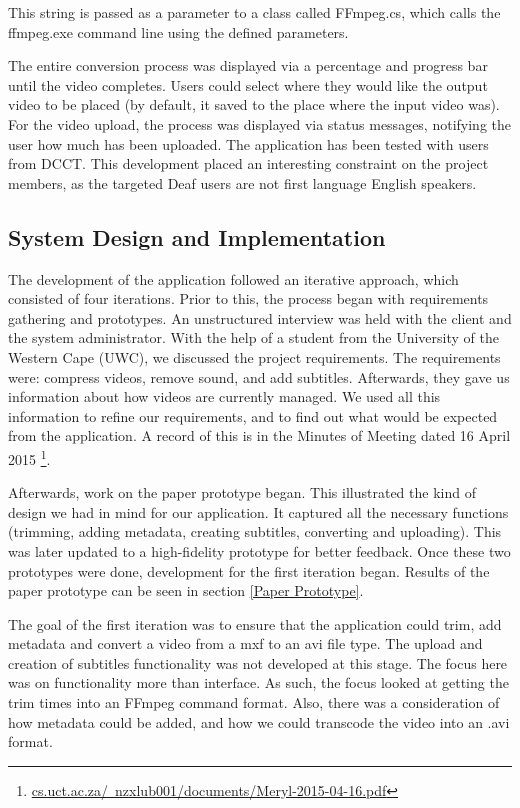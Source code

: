 \documentclass{sig-alternate-05-2015}
\begin{document}
This string is passed as a parameter to a class called FFmpeg.cs, which calls the ffmpeg.exe command line using the defined parameters.

The entire conversion process was displayed via a percentage and progress bar until the video completes. Users could select where they would like the output video to be placed (by default, it saved to the place where the input video was).  For the video upload, the process was displayed via status messages, notifying the user how much has been uploaded. The application has been tested with users from DCCT. This development placed an interesting constraint on the project members, as the targeted Deaf users are not first language English speakers.

\subsection{System Design and Implementation}\label{Sysdev}
The development of the application followed an iterative approach, which consisted of four iterations. Prior to this, the process began with requirements gathering and prototypes. An unstructured interview was held with the client and the system administrator. With the help of a student from the University of the Western Cape (UWC), we discussed the project requirements. The requirements were: compress videos, remove sound, and add subtitles. Afterwards, they gave us information about how videos are currently managed. We used all this information to refine our requirements, and to find out what would be expected from the application. A record of this is in the Minutes of Meeting dated 16 April 2015 \footnote{\href{http://people.cs.uct.ac.za/~nzxlub001/documents/Meryl-2015-04-16.pdf}{cs.uct.ac.za/~nzxlub001/documents/Meryl-2015-04-16.pdf}}.

Afterwards, work on the paper prototype began. This illustrated the kind of design we had in mind for our application. It captured all the necessary functions (trimming, adding metadata, creating subtitles, converting and uploading). This was later updated to a high-fidelity prototype for better feedback. Once these two prototypes were done, development for the first iteration began. Results of the paper prototype can be seen in section \ref{Paper Prototype}.

The goal of the first iteration was to ensure that the application could trim, add metadata and convert a video from a mxf to an avi file type. The upload and creation of subtitles functionality was not developed at this stage. The focus here was on functionality more than interface. As such, the focus looked at getting the trim times into an FFmpeg command format. Also, there was a consideration of how metadata could be added, and how we could transcode the video into an .avi format.
\end{document}

